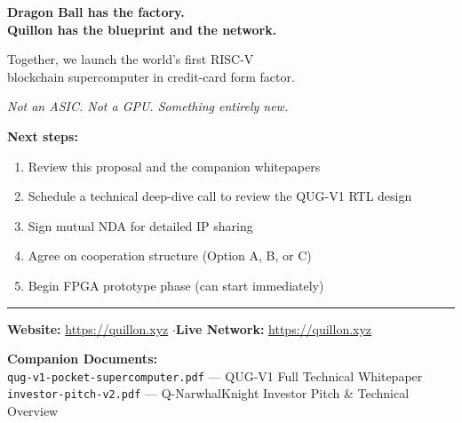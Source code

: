 \documentclass[11pt,a4paper]{article}
\begin{document}
\begin{center}
\begin{tcolorbox}[
    enhanced, colback=qnkpurple!8, colframe=qnkpurple,
    boxrule=1.5pt, arc=8pt, width=14cm,
    shadow={2mm}{-2mm}{0mm}{black!20}
]
\begin{center}
{\Large\bfseries\textcolor{qnkpurple}{Dragon Ball has the factory.\\Quillon has the blueprint and the network.}}

\vspace{0.5cm}

{\large\textcolor{qnkslate}{Together, we launch the world's first RISC-V\\blockchain supercomputer in credit-card form factor.}}

\vspace{0.5cm}

{\small\textcolor{qnkslate}{\textit{Not an ASIC. Not a GPU. Something entirely new.}}}
\end{center}
\end{tcolorbox}
\end{center}

\vspace{1cm}

\textbf{Next steps:}
\begin{enumerate}[leftmargin=1.5em]
    \item Review this proposal and the companion whitepapers
    \item Schedule a technical deep-dive call to review the QUG-V1 RTL design
    \item Sign mutual NDA for detailed IP sharing
    \item Agree on cooperation structure (Option A, B, or C)
    \item Begin FPGA prototype phase (can start immediately)
\end{enumerate}

\vfill

\begin{center}
\textcolor{qnkslate}{\rule{8cm}{0.5pt}}

\vspace{0.3cm}

{\small
\textbf{Website:} \url{https://quillon.xyz} \quad$\cdot$\quad \textbf{Live Network:} \url{https://quillon.xyz}

\vspace{0.2cm}

\textbf{Companion Documents:}\\
\texttt{qug-v1-pocket-supercomputer.pdf} --- QUG-V1 Full Technical Whitepaper\\
\texttt{investor-pitch-v2.pdf} --- Q-NarwhalKnight Investor Pitch \& Technical Overview
}
\end{center}
\end{document}
